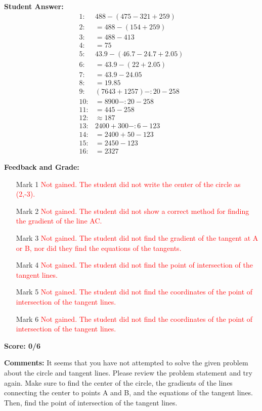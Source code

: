 \documentclass{article}
\begin{document}
\textbf{Student Answer:}
\begin{align*}
1: & 488-(475-321+259) \\
2: & =488-(154+259) \\
3: & =488-413 \\
4: & =75 \\
5: & 43.9-(46.7-24.7+2.05) \\
6: & =43.9-(22+2.05) \\
7: & =43.9-24.05 \\
8: & =19.85 \\
9: & (7643+1257)-:20-258 \\
10: & =8900-:20-258 \\
11: & =445-258 \\
12: & \approx 187 \\
13: & 2400+300-:6-123 \\
14: & =2400+50-123 \\
15: & =2450-123 \\
16: & =2327
\end{align*}

\textbf{Feedback and Grade:}
\begin{itemize}
\item[Mark 1] \textcolor{red}{Not gained. The student did not write the center of the circle as (2,-3).}
\item[Mark 2] \textcolor{red}{Not gained. The student did not show a correct method for finding the gradient of the line AC.}
\item[Mark 3] \textcolor{red}{Not gained. The student did not find the gradient of the tangent at A or B, nor did they find the equations of the tangents.}
\item[Mark 4] \textcolor{red}{Not gained. The student did not find the point of intersection of the tangent lines.}
\item[Mark 5] \textcolor{red}{Not gained. The student did not find the coordinates of the point of intersection of the tangent lines.}
\item[Mark 6] \textcolor{red}{Not gained. The student did not find the coordinates of the point of intersection of the tangent lines.}
\end{itemize}

\textbf{Score: 0/6}

\textbf{Comments:} It seems that you have not attempted to solve the given problem about the circle and tangent lines. Please review the problem statement and try again. Make sure to find the center of the circle, the gradients of the lines connecting the center to points A and B, and the equations of the tangent lines. Then, find the point of intersection of the tangent lines.
\end{document}
